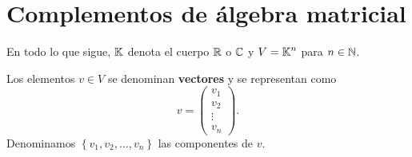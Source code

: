 \chapter{Complementos de álgebra matricial}
En todo lo que sigue, $\displaystyle \mathbb{K} $ denota el cuerpo $\displaystyle \mathbb{R} $ o $\displaystyle \mathbb{C} $ y $\displaystyle V = \mathbb{K}^{n} $ para $\displaystyle n \in \mathbb{N} $.
\begin{definition}[Vector]
Los elementos $\displaystyle v \in V $ se denominan \textbf{vectores} y se representan como 
\[v = \begin{pmatrix} v_{1} \\ v_{2} \\ \vdots \\ v_{n} \end{pmatrix} .\]
Denominamos $\displaystyle \left\{ v_{1}, v_{2}, \ldots, v_{n}\right\}  $ las componentes de $\displaystyle v $.
\end{definition}

